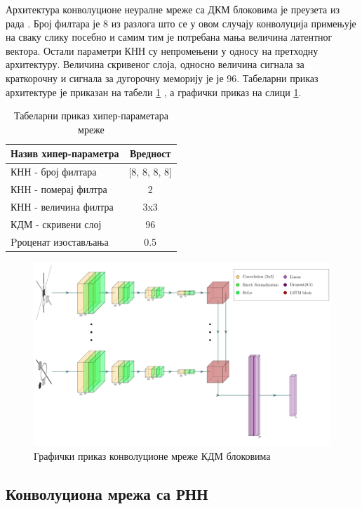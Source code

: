 \documentclass[a4paper, 12pt, master, utf8]{etf}
\begin{document}
Архитектура конволуционе неуралне мреже са ДКМ блоковима је преузета из рада \cite{barrett_measuring_2018}.
Број филтара је 8 из разлога што се у овом случају конволуција примењује на сваку слику посебно и самим тим је потребана мања величина латентног вектора.
Остали параметри КНН су непромењени у односу на претходну архитектуру. 
Величина скривеног слоја, односно величина сигнала за краткорочну и сигнала за дугорочну меморију је је 96.
Табеларни приказ архитектуре је 
приказан на табели \ref{tab:cnnlstm} , а графички приказ на слици \ref{fig:cnnlstm}.

\begin{table}[h]
    \centering
    \begin{tabular}{l | c}
    \hline
    Назив хипер-параметра & Вредност\\
    \hline
        КНН - број филтара & [8, 8, 8, 8]\\
        КНН - померај филтра & 2\\
        КНН - величина филтра & 3x3\\
        КДМ - скривени слој & 96\\
        Pроценат изостављања & 0.5
    \end{tabular}
    \caption{Табеларни приказ хипер-параметара мреже}
    \label{tab:cnnlstm}
\end{table}

\begin{figure}[h]
    \centering
    \includegraphics[width=\textwidth]{arhitekture/cnn_lstm.pdf}
    \caption{Графички приказ конволуционе мреже КДМ блоковима}
    \label{fig:cnnlstm}
\end{figure}

\subsection{Конволуциона мрежа са РНН}
\end{document}
